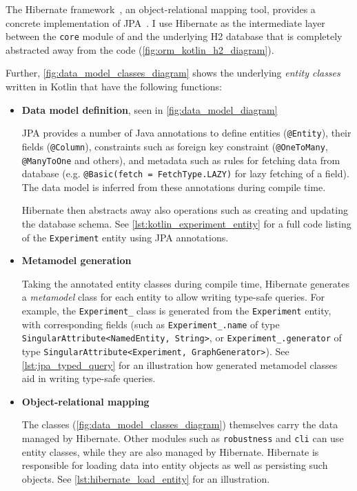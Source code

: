 The Hibernate framework~\cite{ElliottHibernateDeveloperNotebook2004}, an object-relational mapping tool, provides a concrete implementation of JPA~\cite{BauerJavaPersistenceHibernate2015}.
I use Hibernate as the intermediate layer between the \texttt{core} module of \graffs and the underlying H2 database that is completely abstracted away from the \graffs code (\autoref{fig:orm_kotlin_h2_diagram}).



Further, \autoref{fig:data_model_classes_diagram} shows the underlying \textsl{entity classes} written in Kotlin that have the following functions:
\begin{itemize}[topsep=5pt,label=$\bm{\rightarrow}$]
    \item \textbf{Data model definition}, seen in \autoref{fig:data_model_diagram}

    JPA provides a number of Java annotations to define entities (\texttt{@Entity}), their fields (\texttt{@Column}), constraints such as foreign key constraint (\texttt{@OneToMany}, \texttt{@ManyToOne} and others), and metadata such as rules for fetching data from database (e.g. \texttt{@Basic(fetch = FetchType.LAZY)} for lazy fetching of a field).
    The data model is inferred from these annotations during compile time.

    Hibernate then abstracts away also operations such as creating and updating the database schema.
    See \autoref{lst:kotlin_experiment_entity} for a full code listing of the \texttt{Experiment} entity using JPA annotations.

    

    \item \textbf{Metamodel generation}

    Taking the annotated entity classes during compile time, Hibernate generates a \textsl{metamodel} class for each entity to allow writing type-safe queries.
    For example, the \texttt{Experiment\_} class is generated from the \texttt{Experiment} entity, with corresponding fields (such as \texttt{Experiment\_.name} of type \texttt{SingularAttribute<NamedEntity, String>}, or \texttt{Experiment\_.generator} of type \texttt{SingularAttribute<Experiment, GraphGenerator>}).
    See \autoref{lst:jpa_typed_query} for an illustration how generated metamodel classes aid in writing type-safe queries.

    \item \textbf{Object-relational mapping}

    The classes (\autoref{fig:data_model_classes_diagram}) themselves carry the data managed by Hibernate.
    Other modules such as \texttt{robustness} and \texttt{cli} can use entity classes, while they are also managed by Hibernate.
    Hibernate is responsible for loading data into entity objects as well as persisting such objects.
    See \autoref{lst:hibernate_load_entity} for an illustration.
\end{itemize}

